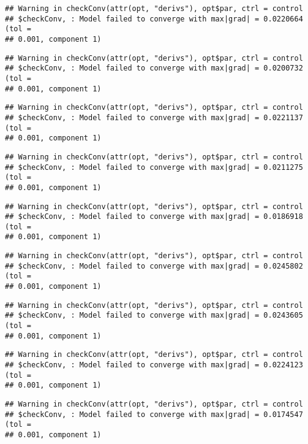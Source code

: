 \documentclass[]{article}
\begin{document}
\begin{verbatim}
## Warning in checkConv(attr(opt, "derivs"), opt$par, ctrl = control
## $checkConv, : Model failed to converge with max|grad| = 0.0220664 (tol =
## 0.001, component 1)
\end{verbatim}

\begin{verbatim}
## Warning in checkConv(attr(opt, "derivs"), opt$par, ctrl = control
## $checkConv, : Model failed to converge with max|grad| = 0.0200732 (tol =
## 0.001, component 1)
\end{verbatim}

\begin{verbatim}
## Warning in checkConv(attr(opt, "derivs"), opt$par, ctrl = control
## $checkConv, : Model failed to converge with max|grad| = 0.0221137 (tol =
## 0.001, component 1)
\end{verbatim}

\begin{verbatim}
## Warning in checkConv(attr(opt, "derivs"), opt$par, ctrl = control
## $checkConv, : Model failed to converge with max|grad| = 0.0211275 (tol =
## 0.001, component 1)
\end{verbatim}

\begin{verbatim}
## Warning in checkConv(attr(opt, "derivs"), opt$par, ctrl = control
## $checkConv, : Model failed to converge with max|grad| = 0.0186918 (tol =
## 0.001, component 1)
\end{verbatim}

\begin{verbatim}
## Warning in checkConv(attr(opt, "derivs"), opt$par, ctrl = control
## $checkConv, : Model failed to converge with max|grad| = 0.0245802 (tol =
## 0.001, component 1)
\end{verbatim}

\begin{verbatim}
## Warning in checkConv(attr(opt, "derivs"), opt$par, ctrl = control
## $checkConv, : Model failed to converge with max|grad| = 0.0243605 (tol =
## 0.001, component 1)
\end{verbatim}

\begin{verbatim}
## Warning in checkConv(attr(opt, "derivs"), opt$par, ctrl = control
## $checkConv, : Model failed to converge with max|grad| = 0.0224123 (tol =
## 0.001, component 1)
\end{verbatim}

\begin{verbatim}
## Warning in checkConv(attr(opt, "derivs"), opt$par, ctrl = control
## $checkConv, : Model failed to converge with max|grad| = 0.0174547 (tol =
## 0.001, component 1)
\end{verbatim}
\end{document}
